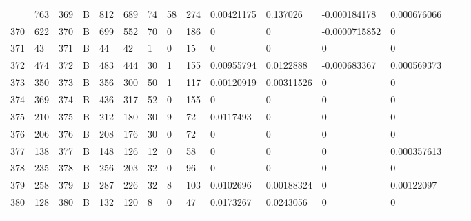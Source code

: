 \begin{longtable}{lllllllllllllll}
\begin{comment}
	369 & 763               & 369 & B   & 812               & 689               & 74                & 58   & 274        & 0.00421175     & 0.137026       & -0.000184178  & 0.000676066  \\
	370 & 622               & 370 & B   & 699               & 552               & 70                & 0    & 186        & 0              & 0              & -0.0000715852 & 0            \\
	371 & 43                & 371 & B   & 44                & 42                & 1                 & 0    & 15         & 0              & 0              & 0             & 0            \\
	372 & 474               & 372 & B   & 483               & 444               & 30                & 1    & 155        & 0.00955794     & 0.0122888      & -0.000683367  & 0.000569373  \\
	373 & 350               & 373 & B   & 356               & 300               & 50                & 1    & 117        & 0.00120919     & 0.00311526     & 0             & 0            \\
	374 & 369               & 374 & B   & 436               & 317               & 52                & 0    & 155        & 0              & 0              & 0             & 0            \\
	375 & 210               & 375 & B   & 212               & 180               & 30                & 9    & 72         & 0.0117493      & 0              & 0             & 0            \\
	376 & 206               & 376 & B   & 208               & 176               & 30                & 0    & 72         & 0              & 0              & 0             & 0            \\
	377 & 138               & 377 & B   & 148               & 126               & 12                & 0    & 58         & 0              & 0              & 0             & 0.000357613  \\
	378 & 235               & 378 & B   & 256               & 203               & 32                & 0    & 96         & 0              & 0              & 0             & 0            \\
	379 & 258               & 379 & B   & 287               & 226               & 32                & 8    & 103        & 0.0102696      & 0.00188324     & 0             & 0.00122097   \\
	380 & 128               & 380 & B   & 132               & 120               & 8                 & 0    & 47         & 0.0173267      & 0.0243056      & 0             & 0            \\

\end{comment}
\end{longtable}
